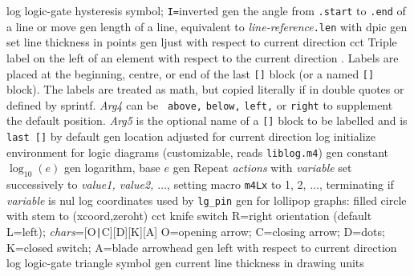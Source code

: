   {log}
  {logic-gate hysteresis symbol; {\tt I=}inverted}
  {gen}
  {the angle from {\tt .start} to {\tt .end} of a line or move}
  {gen}
  {length of a line, equivalent to {\sl line-reference}{\tt .len}
   with dpic}
  {gen}
  {set line thickness in points}
  {gen}
  {ljust with respect to current direction}
  {cct}
  {Triple label on the left of an element with respect to the current
    direction .  Labels are placed at the beginning,
    centre, or end of the last {\tt []} block (or a named {\tt []}
    block). The labels are treated as math, but copied literally if
    in double quotes or defined by sprintf.  {\sl Arg4} can be {\tt
    above,} {\tt below,} {\tt left,} or {\tt right} to supplement the
    default position.  {\sl Arg5} is the optional name of a {\tt []}
    block to be labelled and is {\tt last []} by default}
  {gen}
  {location adjusted for current direction}
  {log}
  {initialize environment for logic diagrams
    (customizable, reads {\tt liblog.m4})}
  {gen}
  {constant $\log_{10}(e)$}
  {gen}
  {logarithm, base $e$}
  {gen}
  {Repeat {\sl actions} with {\sl variable} set successively to
   {\sl value1, value2, $\ldots$}, setting macro {\tt m4Lx} to 1, 2,
   $\ldots$, terminating if {\sl variable} is nul}
  {log}
  {coordinates used by {\tt lg\_pin}}
 {gen}
  {for lollipop graphs: filled circle with stem to
  (xcoord,zeroht)}
  {cct}
  {knife switch R=right orientation (default L=left);
    {\sl chars}=[O{\tt|}C][D][K][A] O=opening arrow; C=closing arrow;
    D=dots; K=closed switch; A=blade arrowhead }
  {gen}
  {left with respect to current direction}
  {log}
  {logic-gate triangle symbol}
  {gen}
  {current line thickness in drawing units}
%
